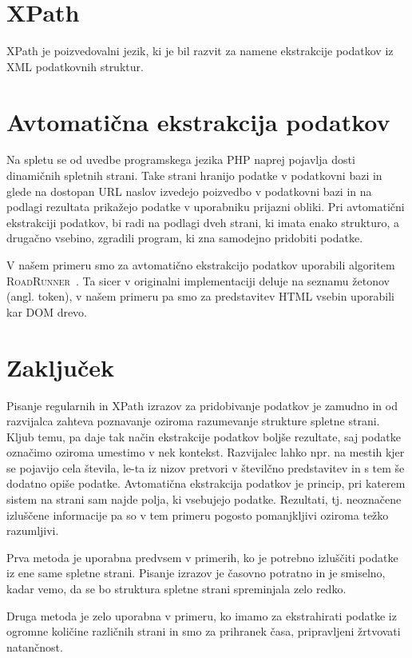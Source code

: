 \documentclass[conference]{IEEEtran}
\begin{document}
	\section{XPath}
	
	XPath je poizvedovalni jezik, ki je bil razvit za namene ekstrakcije podatkov iz XML podatkovnih struktur.
	
	\section{Avtomatična ekstrakcija podatkov}
	
	Na spletu se od uvedbe programskega jezika PHP naprej pojavlja dosti dinamičnih spletnih strani. Take strani hranijo podatke v podatkovni bazi in glede na dostopan URL naslov izvedejo poizvedbo v podatkovni bazi in na podlagi rezultata prikažejo podatke v uporabniku prijazni obliki. Pri avtomatični ekstrakciji podatkov, bi radi na podlagi dveh strani, ki imata enako strukturo, a drugačno vsebino, zgradili program, ki zna samodejno pridobiti podatke.
	
	V našem primeru smo za avtomatično ekstrakcijo podatkov uporabili algoritem \textsc{RoadRunner}~\cite{roadrunner, crescenzi2001automatic}. Ta sicer v originalni implementaciji deluje na seznamu žetonov (angl. token), v našem primeru pa smo za predstavitev HTML vsebin uporabili kar DOM drevo.
	
	\section{Zaključek}
	
	Pisanje regularnih in XPath izrazov za pridobivanje podatkov je zamudno in od razvijalca zahteva poznavanje oziroma razumevanje strukture spletne strani. Kljub temu, pa daje tak način ekstrakcije podatkov boljše rezultate, saj podatke označimo oziroma umestimo v nek kontekst. Razvijalec lahko npr. na mestih kjer se pojavijo cela števila, le-ta iz nizov pretvori v številčno predstavitev in s tem še dodatno opiše podatke. Avtomatična ekstrakcija podatkov je princip, pri katerem sistem na strani sam najde polja, ki vsebujejo podatke. Rezultati, tj. neoznačene izluščene informacije pa so v tem primeru pogosto pomanjkljivi oziroma težko razumljivi.
	
	Prva metoda je uporabna predvsem v primerih, ko je potrebno izluščiti podatke iz ene same spletne strani. Pisanje izrazov je časovno potratno in je smiselno, kadar vemo, da se bo struktura spletne strani spreminjala zelo redko.
	
	Druga metoda je zelo uporabna v primeru, ko imamo za ekstrahirati podatke iz ogromne količine različnih strani in smo za prihranek časa, pripravljeni žrtvovati natančnost.
	
	
	
	
\end{document}
